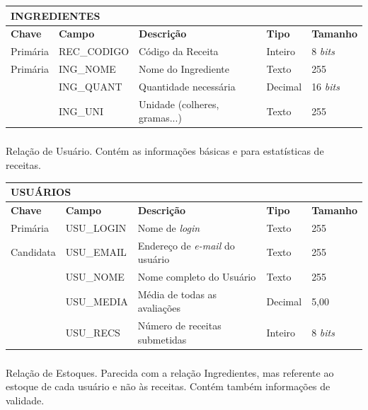 \documentclass[paper=a4, fontsize=11pt]{scrartcl}	%
\numberwithin{equation}{section}															%
\numberwithin{figure}{section}																%
\numberwithin{table}{section}																%
\begin{document}
\begin{center}
\begin{tabular}{ l  l  l  l l }
  \multicolumn{5}{l}{\textbf{INGREDIENTES}} \\
  \hline
  \textbf{Chave} & \textbf{Campo} & \textbf{Descrição} & \textbf{Tipo} & \textbf{Tamanho} \\
  \cline{1-5}
  Primária & REC\_CODIGO & Código da Receita & Inteiro & 8 \emph{bits}  \\
  Primária & ING\_NOME & Nome do Ingrediente & Texto & 255 \\
   & ING\_QUANT & Quantidade necessária & Decimal & 16 \emph{bits} \\
   & ING\_UNI & Unidade (colheres, gramas...) & Texto & 255
\end{tabular}
\end{center}

\newpage

\subsubsection{} Relação de Usuário. Contém as informações básicas e para estatísticas de receitas.

\begin{center}
\begin{tabular}{ l  l  l  l l }
  \multicolumn{5}{l}{\textbf{USUÁRIOS}} \\
  \hline
  \textbf{Chave} & \textbf{Campo} & \textbf{Descrição} & \textbf{Tipo} & \textbf{Tamanho} \\
  \cline{1-5}
   Primária & USU\_LOGIN & Nome de \emph{login} & Texto & 255 \\
   Candidata & USU\_EMAIL & Endereço de \emph{e-mail} do usuário & Texto & 255 \\
   & USU\_NOME & Nome completo do Usuário & Texto & 255 \\
   & USU\_MEDIA & Média de todas as avaliações & Decimal & 5,00 \\
   & USU\_RECS & Número de receitas submetidas & Inteiro & 8 \emph{bits}
\end{tabular}
\end{center}

\vfill

\subsubsection{} Relação de Estoques. Parecida com a relação Ingredientes, mas referente ao estoque de cada usuário e não às receitas. Contém também informações de validade.
\end{document}
